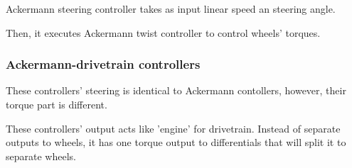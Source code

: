 \documentclass[a4paper,11pt]{article}
\begin{document}
Ackermann steering controller takes as input linear speed an steering angle.

Then, it executes Ackermann twist controller to control wheels' torques.

\subsubsection{Ackermann-drivetrain controllers}

These controllers' steering is identical to Ackermann contollers, however, their torque part is different.

These controllers' output acts like 'engine' for drivetrain. Instead of separate outputs to wheels, it has one torque output to differentials that will split it to separate wheels.

\nocite{*}


\end{document}
